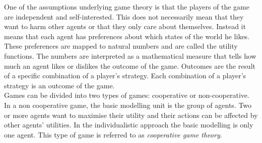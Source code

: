 One of the assumptions underlying game theory is that the players of the game are independent and self-interested. This does not necessarily mean that they want to harm other agents or that they only care about themselves. 
Instead it means that each agent has preferences about which states of the world he likes. These preferences are mapped to natural numbers and are called the utility functions. The numbers are interpreted as a mathematical measure that tells how much an agent likes or dislikes the outcome of the game. Outcomes are the result of a specific combination of a player's strategy. Each combination of a player's strategy is an outcome of the game. \\%

%

Games can be divided into two types of games: cooperative or non-cooperative. In a non cooperative game, the basic modelling unit is the group of agents. 
Two or more agents want to maximise their utility and their actions can be affected by other agents' utilities. In the individualistic approach the basic modelling is only one agent. This type of game is referred to as \textit{cooperative game theory}. 

 


